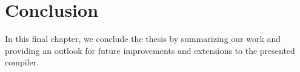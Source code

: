 \chapter{Conclusion} \label{chp:conclusion}
In this final chapter, we conclude the thesis by summarizing our work and providing an outlook for future improvements and extensions to the presented compiler.



